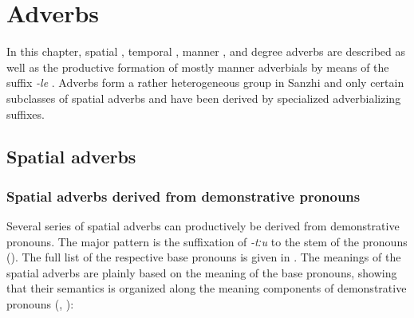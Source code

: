 \chapter{Adverbs}
\label{cpt:morph-adverbs}

In this chapter, spatial , temporal , manner , and degree adverbs  are described as well as the productive formation of mostly manner adverbials by means of the suffix \textit{-le} . Adverbs form a rather heterogeneous group in Sanzhi and only certain subclasses of spatial adverbs and  have been derived by specialized adverbializing suffixes.



\section{Spatial adverbs}
\label{sec:spatialadverb}



\subsection{Spatial adverbs derived from demonstrative pronouns}
\label{ssec:SpatialAdverbsDerivedFromDemonstrativePronouns}

Several series of spatial adverbs can productively be derived from demonstrative pronouns. The major  pattern is the suffixation of \textit{-tːu} to the stem of the pronouns (). The full list of the respective base pronouns is given in . The meanings of the spatial adverbs are plainly based on the meaning of the base pronouns, showing that their semantics is organized along the meaning components of demonstrative pronouns (, ):   

